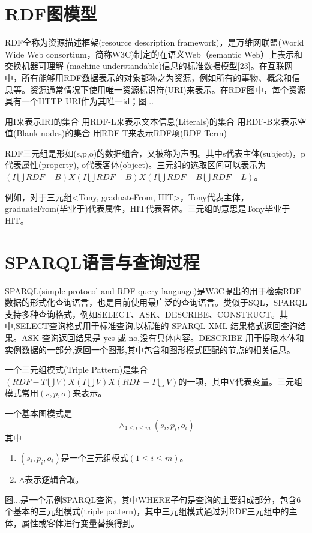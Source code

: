 \section{RDF图模型}

RDF全称为资源描述框架(resource description framework)，是万维网联盟(World Wide Web consortium，简称W3C)制定的在语义Web（semantic Web）上表示和交换机器可理解
(machine-understandable)信息的标准数据模型[23]。在互联网中，所有能够用RDF数据表示的对象都称之为资源，例如所有的事物、概念和信息等。资源通常情况下使用唯一资源标识符(URI)来表示。在RDF图中，每个资源具有一个HTTP URI作为其唯一id；图...

 \begin{definition}    
    用I来表示IRI的集合
    用RDF-L来表示文本信息(Literals)的集合
    用RDF-B来表示空值(Blank nodes)的集合
    用RDF-T来表示RDF项(RDF Term)
\end{definition}

\begin{definition}[（RDF三元组）]    
    RDF三元组是形如(s,p,o)的数据组合，又被称为声明。其中s代表主体(subject)，p代表属性(property),
    o代表客体(object)。三元组的选取区间可以表示为$(I\bigcup RDF-B)X(I\bigcup RDF-B)X(I\bigcup RDF-B\bigcup RDF-L)$。
    
    例如，对于三元组<Tony, graduateFrom, HIT>，Tony代表主体，graduateFrom(毕业于)代表属性，HIT代表客体。三元组的意思是Tony毕业于HIT。
\end{definition}

\section{SPARQL语言与查询过程}

SPARQL(simple protocol and RDF query language)是W3C提出的用于检索RDF数据的形式化查询语言，也是目前使用最广泛的查询语言。类似于SQL，SPARQL支持多种查询格式，例如SELECT、ASK、DESCRIBE、CONSTRUCT。其中,SELECT查询格式用于标准查询,以标准的 SPARQL XML 结果格式返回查询结果。ASK 查询返回结果是 yes 或 no,没有具体内容。DESCRIBE 用于提取本体和实例数据的一部分,返回一个图形,其中包含和图形模式匹配的节点的相关信息。
\begin{definition}[（三元组模式）] 
    \label{Triple}   
    一个三元组模式(Triple Pattern)是集合$(RDF-T \bigcup V)X(I \bigcup V)X(RDF-T \bigcup V)$的一项，其中V代表变量。三元组模式常用$(s,p,o)$来表示。
\end{definition}
\begin{definition}    
    \label{BGP}
    一个基本图模式是$$\wedge_{1\leqslant i\leqslant m}(s_i,p_i,o_i)$$
    其中
    \begin{enumerate}
        \item $(s_i,p_i,o_i)$是一个三元组模式$(1 \leqslant  i \leqslant m)$。
        \item $\wedge$表示逻辑合取。
    \end{enumerate}
    
\end{definition}
图...是一个示例SPARQL查询，其中WHERE子句是查询的主要组成部分，包含6个基本的三元组模式(triple pattern)，其中三元组模式通过对RDF三元组中的主体，属性或客体进行变量替换得到。

